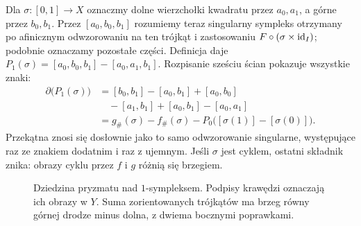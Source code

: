\begin{przyklad}
\label{prz:pryzmat-drogi}
Dla $\sigma:[0,1]\to X$ oznaczmy dolne wierzchołki kwadratu
przez $a_0,a_1$, a górne przez $b_0,b_1$.
Przez $[a_0,b_0,b_1]$ rozumiemy teraz singularny sympleks
otrzymany po afinicznym odwzorowaniu na ten trójkąt i zastosowaniu
$F\circ(\sigma\times\mathrm{id}_I)$; podobnie oznaczamy pozostałe części.
Definicja daje $P_1(\sigma)=[a_0,b_0,b_1]-[a_0,a_1,b_1]$.
Rozpisanie sześciu ścian pokazuje wszystkie znaki:
\[
 \begin{aligned}
 \partial\bigl(P_1(\sigma)\bigr)
 &=[b_0,b_1]-[a_0,b_1]+[a_0,b_0]\\
 &\quad-[a_1,b_1]+[a_0,b_1]-[a_0,a_1]\\
 &=g_\#(\sigma)-f_\#(\sigma)
   -P_0\bigl([\sigma(1)]-[\sigma(0)]\bigr).
 \end{aligned}
\]
Przekątna znosi się dosłownie jako to samo odwzorowanie
singularne, występujące raz ze znakiem dodatnim i raz z ujemnym.
Jeśli $\sigma$ jest cyklem, ostatni składnik znika: obrazy
cyklu przez $f$ i $g$ różnią się brzegiem.
\end{przyklad}

\begin{figure}[!htbp]
\centering
{}
\caption{Dziedzina pryzmatu nad $1$-sympleksem. Podpisy krawędzi
oznaczają ich obrazy w $Y$. Suma zorientowanych trójkątów ma brzeg
równy górnej drodze minus dolna, z dwiema bocznymi poprawkami.}
\label{fig:pryzmat-homologia}
\end{figure}

